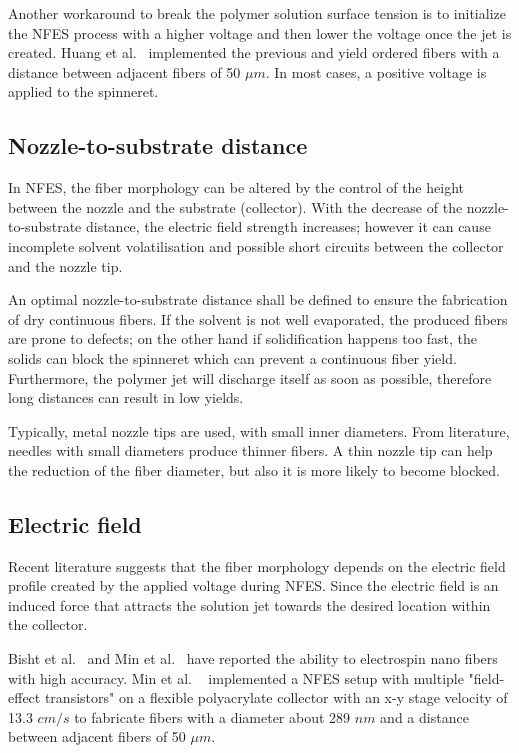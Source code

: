 \documentclass[5p,,preprint,12pt,twocolumn]{elsarticle}
\begin{document}
Another workaround to break the polymer solution surface tension is to initialize the NFES process with a higher voltage and then lower the voltage once the jet is created. Huang et al.\unskip~\cite{527120:11974311} implemented the previous and yield ordered fibers with a distance between adjacent fibers of 50 $\mu m $. In most cases, a positive voltage is applied to the spinneret.



\subsection{Nozzle-to-substrate distance}In NFES, the fiber morphology can be altered by the control of the height between the nozzle and the substrate (collector). With the decrease of the nozzle-to-substrate distance, the electric field strength increases; however it can cause incomplete solvent volatilisation and possible short circuits between the collector and the nozzle tip.

An optimal nozzle-to-substrate distance shall be defined to ensure the fabrication of dry continuous fibers. If the solvent is not well evaporated, the produced fibers are prone to defects; on the other hand if solidification happens too fast, the solids can block the spinneret which can prevent a continuous fiber yield. Furthermore, the polymer jet will discharge itself as soon as possible, therefore long distances can result in low yields.

Typically, metal nozzle tips are used, with small inner diameters. From literature, needles with small diameters produce thinner fibers. A thin nozzle tip can help the reduction of the fiber diameter, but also it is more likely to become blocked.



\subsection{Electric field}Recent literature suggests that the fiber morphology depends on the electric field profile created by the applied voltage during NFES. Since the electric field is an induced force that attracts the solution jet towards the desired location within the collector.

Bisht et al.\unskip~\cite{527120:11973130} and Min et al.\unskip~\cite{527120:11974316} have reported the ability to electrospin nano fibers with high accuracy. Min et al. \unskip~\cite{527120:11974316} implemented a NFES setup with multiple "field-effect transistors" on a flexible polyacrylate collector with an x-y stage velocity of 13.3 $cm/s $ to fabricate fibers with a diameter about 289 $nm $ and a distance between adjacent fibers of 50 $\mu m $. 
\end{document}
